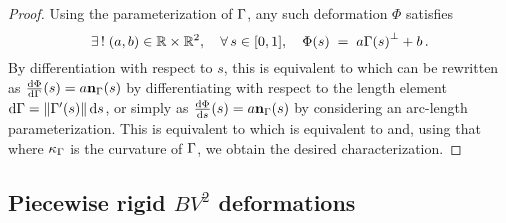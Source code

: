 \begin{proof}
Using the parameterization of $\Gamma$, any such deformation $\Phi$ satisfies 
\begin{equation}
	\label{eq:rigidg}
	\exists\, !\; (a,b) \in {\mathbb R}\times{\mathbb R}^2, \quad \forall \, s \in [0,1], \quad \Phi(s) \; = \;  a{\Gamma(s)}^\bot  + b \,.
\end{equation}
By differentiation with respect to \! $s$, this is equivalent to 
which can be rewritten as $\frac{\mathrm{d}\Phi}{\mathrm{d}\Gamma} (s) =  a \mathbf{n}_\Gamma(s) $ by differentiating with respect to \! the length element $\mathrm{d}\Gamma = \| \Gamma'(s) \|\,\mathrm{d} s$,
or simply as $ \frac{\mathrm{d}\Phi}{\mathrm{d} s}(s)  = a \mathbf{n}_\Gamma(s) $ 
by considering an arc-length parameterization. 
This is equivalent to 
which is  equivalent to
and, using that 
where $\kappa_\Gamma$ is the curvature of $\Gamma$, we obtain the desired characterization.
\end{proof} 





\subsection{Piecewise rigid $BV^2$ deformations }\label{BV2M}

